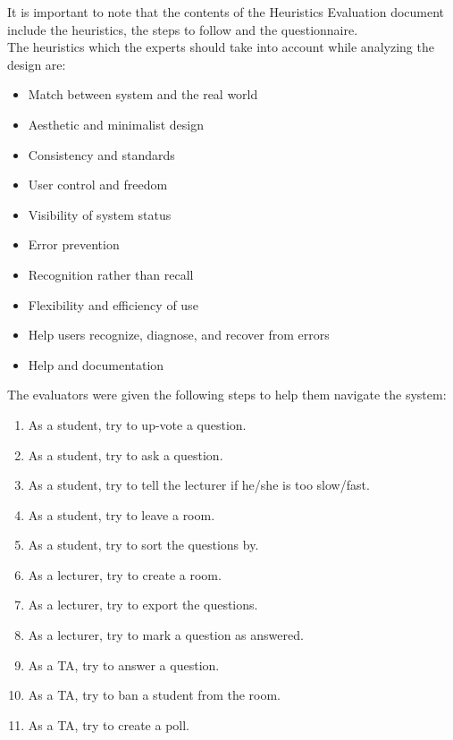 \documentclass{article}
\begin{document}
It is important to note that the contents of the Heuristics Evaluation document include the heuristics, the steps to follow and the questionnaire.\\

The heuristics which the experts should take into account while analyzing the design are:
\begin{itemize}
    \item Match between system and the real world
    \item Aesthetic and minimalist design
    \item Consistency and standards
    \item User control and freedom
    \item Visibility of system status
    \item Error prevention
    \item Recognition rather than recall
    \item Flexibility and efficiency of use
    \item Help users recognize, diagnose, and recover from errors
    \item Help and documentation
\end{itemize}
The evaluators were given the following steps to help them navigate the system:
\begin{enumerate}
    \item As a student, try to up-vote a question.
    \item As a student, try to ask a question.
    \item As a student, try to tell the lecturer if he/she is too slow/fast.
    \item As a student, try to leave a room.
    \item As a student, try to sort the questions by.
    \item As a lecturer, try to create a room.
    \item As a lecturer, try to export the questions.
    \item As a lecturer, try to mark a question as answered.
    \item As a TA, try to answer a question.
    \item As a TA, try to ban a student from the room.
    \item As a TA, try to create a poll.
\end{enumerate}
\end{document}
